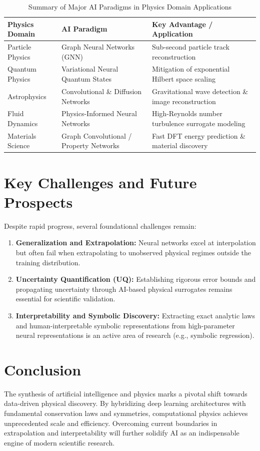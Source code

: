 \documentclass[11pt,a4paper]{article}
\begin{document}
\begin{table}[h]
\centering
\caption{Summary of Major AI Paradigms in Physics Domain Applications}
\vspace{0.2cm}
\begin{tabular}{lll}
\toprule
\textbf{Physics Domain} & \textbf{AI Paradigm} & \textbf{Key Advantage / Application} \\
\midrule
Particle Physics & Graph Neural Networks (GNN) & Sub-second particle track reconstruction \\
Quantum Physics & Variational Neural Quantum States & Mitigation of exponential Hilbert space scaling \\
Astrophysics & Convolutional \& Diffusion Networks & Gravitational wave detection \& image reconstruction \\
Fluid Dynamics & Physics-Informed Neural Networks & High-Reynolds number turbulence surrogate modeling \\
Materials Science & Graph Convolutional / Property Networks & Fast DFT energy prediction \& material discovery \\
\bottomrule
\end{tabular}
\end{table}

\section{Key Challenges and Future Prospects}
Despite rapid progress, several foundational challenges remain:
\begin{enumerate}
    \item \textbf{Generalization and Extrapolation:} Neural networks excel at interpolation but often fail when extrapolating to unobserved physical regimes outside the training distribution.
    \item \textbf{Uncertainty Quantification (UQ):} Establishing rigorous error bounds and propagating uncertainty through AI-based physical surrogates remains essential for scientific validation.
    \item \textbf{Interpretability and Symbolic Discovery:} Extracting exact analytic laws and human-interpretable symbolic representations from high-parameter neural representations is an active area of research (e.g., symbolic regression).
\end{enumerate}

\section{Conclusion}
The synthesis of artificial intelligence and physics marks a pivotal shift towards data-driven physical discovery. By hybridizing deep learning architectures with fundamental conservation laws and symmetries, computational physics achieves unprecedented scale and efficiency. Overcoming current boundaries in extrapolation and interpretability will further solidify AI as an indispensable engine of modern scientific research.
\end{document}
